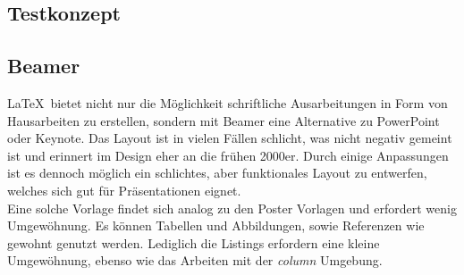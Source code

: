 \subsection{Testkonzept}


\subsection{Beamer}

\LaTeX~bietet nicht nur die Möglichkeit schriftliche Ausarbeitungen in Form von Hausarbeiten zu erstellen, sondern mit Beamer eine Alternative
zu PowerPoint oder Keynote. Das Layout ist in vielen Fällen schlicht, was nicht negativ gemeint ist und erinnert im Design eher an die 
frühen 2000er. Durch einige Anpassungen ist es dennoch möglich ein schlichtes, aber funktionales Layout zu entwerfen, welches sich gut für 
Präsentationen eignet.\\
Eine solche Vorlage findet sich analog zu den Poster Vorlagen und erfordert wenig Umgewöhnung. Es können Tabellen und Abbildungen, sowie Referenzen 
wie gewohnt genutzt werden. Lediglich die Listings erfordern eine kleine Umgewöhnung, ebenso wie das Arbeiten mit der \textit{column} Umgebung.


